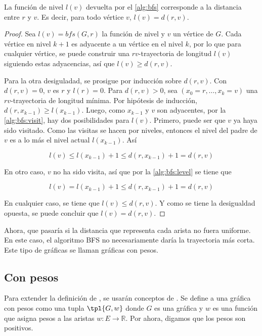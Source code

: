 \begin{theorem}
  \label{theo:bfs}
  La función de nivel $l(v)$ devuelta por el \cref{alg:bfs} corresponde a la
  distancia entre $r$ y $v$. Es decir, para todo vértice $v$, $l(v) = d(r, v)$.
\end{theorem}

\begin{proof}
  Sea $l(v) = bfs(G, r)$ la función de nivel y $v$ un vértice de $G$. Cada
  vértice en nivel $k + 1$ es adyacente a un vértice en el nivel $k$, por lo que
  para cualquier vértice, se puede construir una $rv$-trayectoria de longitud
  $l(v)$ siguiendo estas adyacencias, así que $l(v) \ge  d(r, v)$.

  Para la otra desiguladad, se prosigue por inducción sobre $d(r, v)$. Con
  $d(r, v) = 0$, $v$ es $r$ y $l(r) = 0$. Para $d(r, v) > 0$, sea $(x_{0} = r,
  \dots, x_{k} = v)$ una $rv$-trayectoria de longitud mínima. Por hipótesis de
  inducción, $d(r, x_{k-1}) \ge l(x_{k-1})$. Luego, como $x_{k-1}$ y $v$ son
  adyacentes, por la \cref{alg:bfs:visit}, hay dos posibilidades para $l(v)$.
  Primero, puede ser que $v$ ya haya sido visitado. Como las visitas se hacen
  por niveles, entonces el nivel del padre de $v$ es a lo más el nivel actual
  $l(x_{k-1})$. Así

  \[
    l(v) \le l(x_{k-1}) + 1 \le d(r, x_{k-1}) + 1 = d(r, v)
  \]

  En otro caso, $v$ no ha sido visita, así que por la \cref{alg:bfs:level} se
  tiene que

  \[
    l(v) = l(x_{k-1}) + 1 \le d(r, x_{k-1}) + 1 = d(r, v)
  \]

  En cualquier caso, se tiene que $l(v) \le d(r, v)$. Y como se tiene la
  desigualdad opuesta, se puede concluir que $l(v) = d(r, v)$.
  \end{proof}

Ahora, que pasaría si la distancia que representa cada arista no fuera uniforme.
En este caso, el algoritmo BFS no necesariamente daría la trayectoria más corta.
Este tipo de gráficas se llaman gráficas con pesos.

\subsection{Con pesos}

Para extender la definición de \cite{Diestel2017}, se usarán conceptos de
\cite{Bondy2008}. Se define a una gráfica con pesos como una tupla $\tpl{G, w}$
donde $G$ es una gráfica y $w$ es una función que asigna pesos a las aristas
$w: E \to \mathbb{R}$. Por ahora, digamos que los pesos son positivos.

